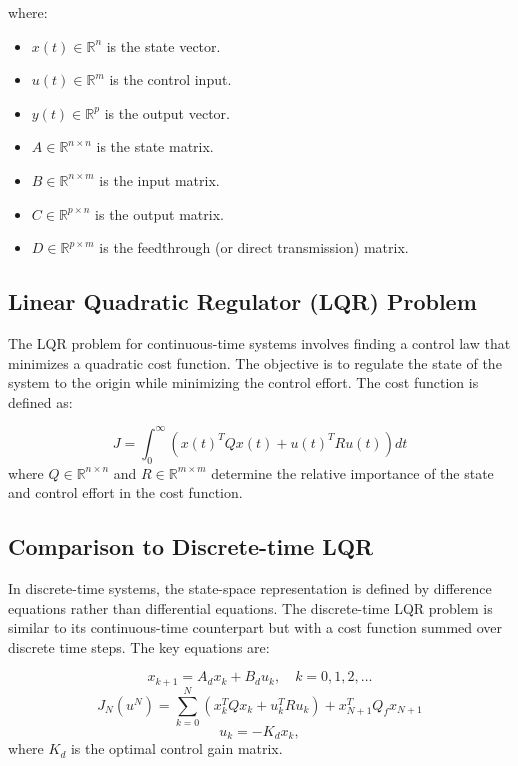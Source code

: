 \documentclass[a4 paper]{article}
\begin{document}
where:
\begin{itemize}
    \item $x(t) \in \mathbb{R}^n$ is the state vector.
    \item $u(t) \in \mathbb{R}^m$ is the control input.
    \item $y(t) \in \mathbb{R}^p$ is the output vector.
    \item $A \in \mathbb{R}^{n \times n}$ is the state matrix.
    \item $B \in \mathbb{R}^{n \times m}$ is the input matrix.
    \item $C \in \mathbb{R}^{p \times n}$ is the output matrix.
    \item $D \in \mathbb{R}^{p \times m}$ is the feedthrough (or direct transmission) matrix.
\end{itemize}

\subsection{Linear Quadratic Regulator (LQR) Problem}
The LQR problem for continuous-time systems involves finding a control law that minimizes a quadratic cost function. 
The objective is to regulate the state of the system to the origin while minimizing the control effort. The cost function is defined as:

\begin{equation}
    J = \int_{0}^{\infty} \left( x(t)^T Q x(t) + u(t)^T R u(t) \right) dt
\end{equation}
where $Q \in \mathbb{R}^{n \times n}$ and $R \in \mathbb{R}^{m \times m}$ determine the relative importance of the state and 
control effort in the cost function.


\subsection{Comparison to Discrete-time LQR}
In discrete-time systems, the state-space representation is defined by difference equations rather than differential equations. 
The discrete-time LQR problem is similar to its continuous-time counterpart but with a cost function summed over discrete time steps. 
The key equations are:

\begin{equation}
    x_{k+1} = A_d x_k + B_d u_k, \quad k = 0, 1, 2, \ldots
\end{equation}
\begin{equation}
    J_N(u^N) = \sum_{k=0}^{N} \left( x_k^T Q x_k + u_k^T R u_k \right) + x_{N+1}^T Q_f x_{N+1}
\end{equation}
\begin{equation}
    u_k = -K_d x_k,
\end{equation}
where $K_d$ is the optimal control gain matrix.
\end{document}
